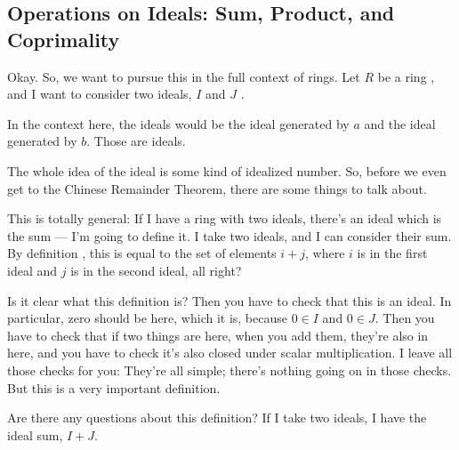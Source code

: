 \subsection{Operations on Ideals: Sum, Product, and Coprimality}

\begin{speech}[01:10:32 - 01:12:09]
Okay. So, we want to pursue this in the full context of rings. Let $R$ be a ring , and I want to consider two ideals, $I$ and $J$ .

In the context here, the ideals would be the ideal generated by $a$ and the ideal generated by $b$. Those are ideals.

The whole idea of the ideal is some kind of idealized number. So, before we even get to the Chinese Remainder Theorem, there are some things to talk about.

This is totally general: If I have a ring with two ideals, there's an ideal which is the sum --- I'm going to define it. I take two ideals, and I can consider their sum. By definition , this is equal to the set of elements $i + j$, where $i$ is in the first ideal and $j$ is in the second ideal, all right?

Is it clear what this definition is? Then you have to check that this is an ideal. In particular, zero should be here, which it is, because $0 \in I$ and $0 \in J$. Then you have to check that if two things are here, when you add them, they're also in here, and you have to check it's also closed under scalar multiplication. I leave all those checks for you: They're all simple; there's nothing going on in those checks. But this is a very important definition.

Are there any questions about this definition? If I take two ideals, I have the ideal sum, $I + J$.
\end{speech}

